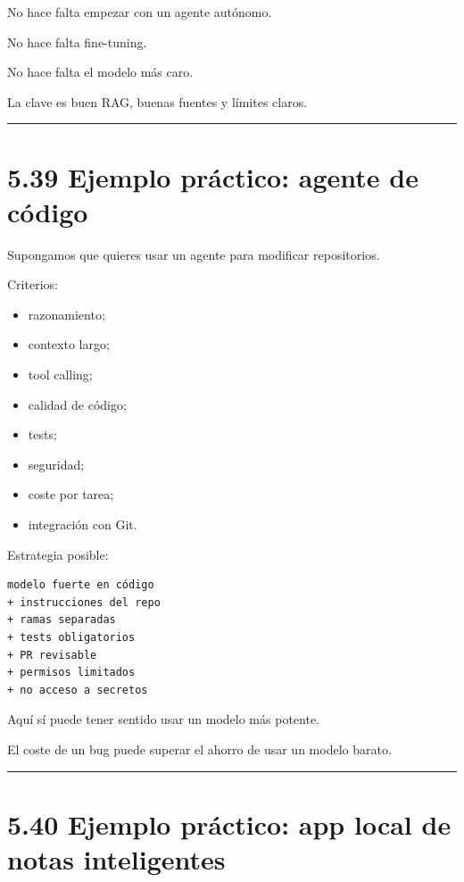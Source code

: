 No hace falta empezar con un agente autónomo.

No hace falta fine-tuning.

No hace falta el modelo más caro.

La clave es buen RAG, buenas fuentes y límites claros.

\begin{center}\rule{0.5\linewidth}{0.5pt}\end{center}

\section{5.39 Ejemplo práctico: agente de
código}\label{ejemplo-pruxe1ctico-agente-de-cuxf3digo-1}

Supongamos que quieres usar un agente para modificar repositorios.

Criterios:

\begin{itemize}
\tightlist
\item
  razonamiento;
\item
  contexto largo;
\item
  tool calling;
\item
  calidad de código;
\item
  tests;
\item
  seguridad;
\item
  coste por tarea;
\item
  integración con Git.
\end{itemize}

Estrategia posible:

\begin{lstlisting}
modelo fuerte en código
+ instrucciones del repo
+ ramas separadas
+ tests obligatorios
+ PR revisable
+ permisos limitados
+ no acceso a secretos
\end{lstlisting}

Aquí sí puede tener sentido usar un modelo más potente.

El coste de un bug puede superar el ahorro de usar un modelo barato.

\begin{center}\rule{0.5\linewidth}{0.5pt}\end{center}

\section{5.40 Ejemplo práctico: app local de notas
inteligentes}\label{ejemplo-pruxe1ctico-app-local-de-notas-inteligentes}

